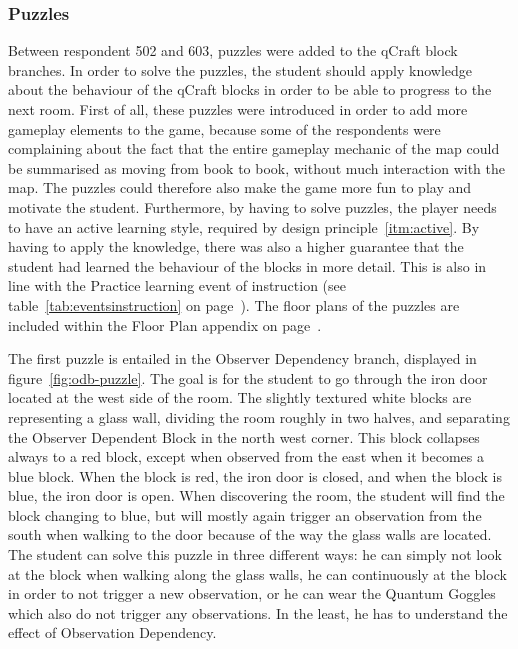 \documentclass[11pt,twoside]{report} %
\begin{document}
\subsubsection{Puzzles}

Between respondent 502 and 603, puzzles were added to the qCraft block branches. In order to solve the puzzles, the student should apply knowledge about the behaviour of the qCraft blocks in order to be able to progress to the next room. First of all, these puzzles were introduced in order to add more gameplay elements to the game, because some of the respondents were complaining about the fact that the entire gameplay mechanic of the map could be summarised as moving from book to book, without much interaction with the map. The puzzles could therefore also make the game more fun to play and motivate the student. Furthermore, by having to solve puzzles, the player needs to have an active learning style, required by design principle~\ref{itm:active}. By having to apply the knowledge, there was also a higher guarantee that the student had learned the behaviour of the blocks in more detail. This is also in line with the Practice learning event of instruction (see table~\ref{tab:eventsinstruction} on page~\pageref{tab:eventsinstruction}). The floor plans of the puzzles are included within the Floor Plan appendix on page~\pageref{app:floorplans}.

The first puzzle is entailed in the Observer Dependency branch, displayed in figure~\ref{fig:odb-puzzle}. The goal is for the student to go through the iron door located at the west side of the room. The slightly textured white blocks are representing a glass wall, dividing the room roughly in two halves, and separating the Observer Dependent Block in the north west corner. This block collapses always to a red block, except when observed from the east when it becomes a blue block. When the block is red, the iron door is closed, and when the block is blue, the iron door is open. When discovering the room, the student will find the block changing to blue, but will mostly again trigger an observation from the south when walking to the door because of the way the glass walls are located. The student can solve this puzzle in three different ways: he can simply not look at the block when walking along the glass walls, he can continuously at the block in order to not trigger a new observation, or he can wear the Quantum Goggles which also do not trigger any observations. In the least, he has to understand the effect of Observation Dependency.
\end{document}

